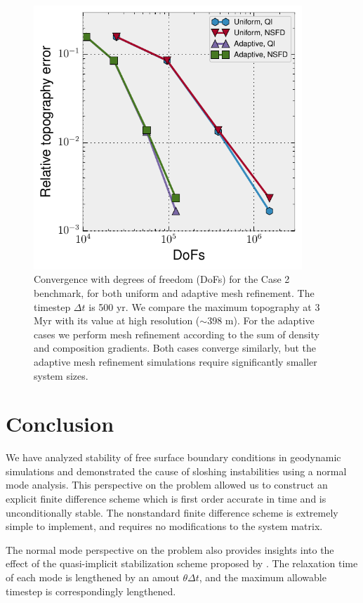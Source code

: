 \documentclass[preprint,12pt,authoryear]{elsarticle}
\begin{document}
\begin{figure}
\includegraphics[width=0.9\textwidth]{figures/amr.pdf}
\caption{Convergence with degrees of freedom (DoFs) for the \citet{crameri2012comparison} Case 2 benchmark, for both uniform and adaptive mesh refinement. The timestep $\Delta t$ is 500 yr. We compare the maximum topography at 3 Myr with its value at high resolution ($\sim$398 m). For the adaptive cases we perform mesh refinement according to the sum of density and composition gradients. Both cases converge similarly, but the adaptive mesh refinement simulations require significantly smaller system sizes.}
\label{fig:amr}
\end{figure}

\section{Conclusion}
We have analyzed stability of free surface boundary conditions in geodynamic simulations and 
demonstrated the cause of sloshing instabilities using a normal mode analysis.
This perspective on the problem allowed us to construct an explicit finite difference 
scheme which is first order accurate in time and is unconditionally stable.
The nonstandard finite difference scheme is extremely simple to implement, and 
requires no modifications to the system matrix.

The normal mode perspective on the problem also provides insights into the effect of 
the quasi-implicit stabilization scheme proposed by \citet{kaus2010stabilization}.
The relaxation time of each mode is lengthened by an amout $\theta \Delta t$, and the
maximum allowable timestep is correspondingly lengthened.
\end{document}
